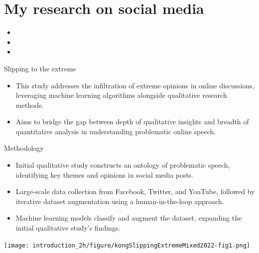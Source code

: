 \documentclass[serif, aspectratio=169]{beamer}
\begin{document}
\nocite{salganik_bit_2018}
\nocite{bailo_hybrid_2017}

\section{My research on social media}

\begin{frame}

\begin{itemize}
\item {}
\item  {}
\item {}
\end{itemize}

\end{frame}


\begin{frame}{Slipping to the extreme}
\item {}
\begin{itemize}
  \item This study addresses the infiltration of extreme opinions in online discussions, leveraging machine learning algorithms alongside qualitative research methods.
  \item Aims to bridge the gap between depth of qualitative insights and breadth of quantitative analysis in understanding problematic online speech.
\end{itemize}
\end{frame}

\begin{frame}{Methodology}
\begin{itemize}
  \item Initial qualitative study constructs an ontology of problematic speech, identifying key themes and opinions in social media posts.
  \item Large-scale data collection from Facebook, Twitter, and YouTube, followed by iterative dataset augmentation using a human-in-the-loop approach.
  \item Machine learning models classify and augment the dataset, expanding the initial qualitative study's findings.
\end{itemize}
\end{frame}

\begin{frame}

\texttt{[image: introduction\_2h/figure/kongSlippingExtremeMixed2022-fig1.png]}

\end{frame}
\end{document}
